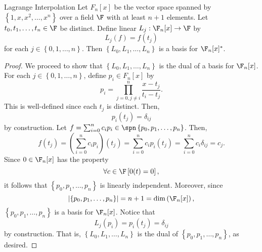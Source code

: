 \documentclass[math_245.tex]{subfiles}
\begin{document}
    \begin{theorem}{Lagrange Interpolation}
        Let $F_n[x]$ be the vector space spanned by $\left\lbrace 1, x, x^2, \ldots, x^n \right\rbrace$ over a field $\F$ with at least $n+1$ elements. Let $t_0, t_1, \ldots, t_n\in \F$ be distinct. Define linear $L_j: \F_n[x]\to \F$ by
        \begin{equation*}
            L_j(f) = f(t_j)
        \end{equation*}
        for each $j\in \left\lbrace 0, 1, \ldots, n \right\rbrace$. Then $\left\lbrace L_0, L_1, \ldots, L_n \right\rbrace$ is a basis for $\F_n[x]^*$.
    \end{theorem}

    \begin{proof}
        We proceed to show that $\left\lbrace L_0, L_1, \ldots, L_n \right\rbrace$ is the dual of a basis for $\F_n[x]$. For each $j\in \left\lbrace 0, 1, \ldots, n \right\rbrace$, define $p_i\in F_n[x]$ by
        \begin{equation*}
            p_i = \prod^n_{j=0,j\neq i} \frac{x-t_j}{t_i-t_j}.
        \end{equation*}
        This is well-defined since each $t_j$ is distinct. Then,
        \begin{equation*}
            p_i(t_j) = \delta_{ij}
        \end{equation*}
        by construction. Let $f = \sum^n_{i=0} c_ip_i\in \spn \left\lbrace p_0, p_1, \ldots, p_n \right\rbrace$. Then,
        \begin{equation*}
            f(t_j) = \left( \sum^n_{i=0} c_ip_i \right)(t_j) = \sum^n_{i=0} c_ip_i(t_j) = \sum^n_{i=0} c_i\delta_{ij} = c_j.
        \end{equation*}
        Since $0\in \F_n[x]$ has the property
        \begin{equation*}
            \forall c\in \F \left[ 0(t) = 0 \right], 
        \end{equation*}
        it follows that $\left\lbrace p_0, p_1, \ldots, p_n \right\rbrace$ is linearly independent. Moreover, since
        \begin{equation*}
            \left| \left\lbrace p_0, p_1, \ldots, p_n \right\rbrace  \right| = n+1 = \dim \left( \F_n[x] \right), 
        \end{equation*}
        $\left\lbrace p_0, p_1, \ldots, p_n \right\rbrace$ is a basis for $\F_n[x]$. Notice that
        \begin{equation*}
            L_j(p_i) = p_i(t_j) = \delta_{ij}
        \end{equation*}
        by construction. That is, $\left\lbrace L_0, L_1, \ldots, L_n \right\rbrace$ is the dual of $\left\lbrace p_0, p_1, \ldots, p_n \right\rbrace$, as desired.
    \end{proof}
\end{document}
